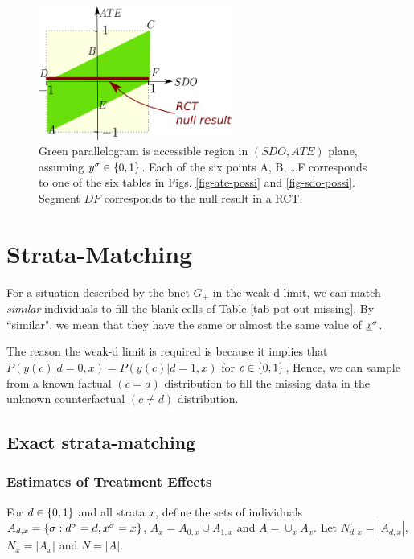 \begin{figure}[h!]
\centering
\includegraphics[width=2.5in]
{pot-out/sdo-ate-polytope.png}
\caption{
Green parallelogram
is accessible region in
$(SDO,ATE)$ plane,
assuming $y^\sigma\in \{0,1\}$.
Each of the
six points A, B, \ldots F
corresponds to one of the six tables
in Figs. \ref{fig-ate-possi}
and \ref{fig-sdo-possi}.
Segment $DF$ 
corresponds to the null
result in a RCT. 
} 
\label{fig-sdo-ate-polytope}
\end{figure}



\section{Strata-Matching}

For a situation
described by
the bnet $G_{+}$
\ul{ in the weak-d limit},
we can match {\it similar}
individuals to fill the blank cells of
 Table \ref{tab-pot-out-missing}.
By ``similar", we mean that
they have the same or almost the same
value of ${\underline{x}}^\sigma$.

The reason the weak-d limit
is required is because
it implies that $P(y(c)|d=0,x)=
P(y(c)|d=1,x)$ for $c\in \{0,1\}$,
Hence, we can sample from a 
known factual $(c=d)$
distribution to
fill  the missing data
in the unknown counterfactual $(c\neq d)$
distribution.





\subsection{Exact   strata-matching}

\subsubsection{Estimates of Treatment Effects}
\label{sec-estimates}
For $ d\in \{0,1\}$ and all strata $x$,
define the sets of individuals
$A_{ d,x}=\{\sigma:  d^\sigma= d, x^\sigma=x\}$,
$A_x=A_{0,x}\cup A_{1,x}$ and $A=\cup_x A_x$.
Let $N_{ d,x}=|A_{ d,x}|$,
$N_x= |A_x|$ and $N=|A|$.

